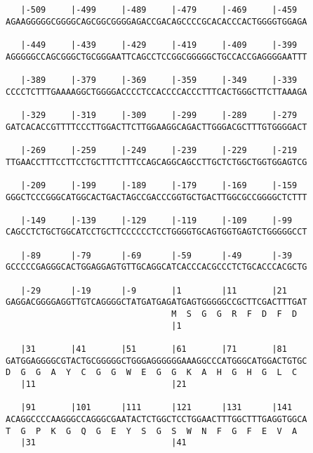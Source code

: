 \documentclass{article}
\begin{document}
\begin{Verbatim}
   |-509     |-499     |-489     |-479     |-469     |-459  
AGAAGGGGGCGGGGCAGCGGCGGGGAGACCGACAGCCCCGCACACCCACTGGGGTGGAGA
                                                            
   |-449     |-439     |-429     |-419     |-409     |-399  
AGGGGGCCAGCGGGCTGCGGGAATTCAGCCTCCGGCGGGGGCTGCCACCGAGGGGAATTT
                                                            
   |-389     |-379     |-369     |-359     |-349     |-339  
CCCCTCTTTGAAAAGGCTGGGGACCCCTCCACCCCACCCTTTCACTGGGCTTCTTAAAGA
                                                            
   |-329     |-319     |-309     |-299     |-289     |-279  
GATCACACCGTTTTCCCTTGGACTTCTTGGAAGGCAGACTTGGGACGCTTTGTGGGGACT
                                                            
   |-269     |-259     |-249     |-239     |-229     |-219  
TTGAACCTTTCCTTCCTGCTTTCTTTCCAGCAGGCAGCCTTGCTCTGGCTGGTGGAGTCG
                                                            
   |-209     |-199     |-189     |-179     |-169     |-159  
GGGCTCCCGGGCATGGCACTGACTAGCCGACCCGGTGCTGACTTGGCGCCGGGGCTCTTT
                                                            
   |-149     |-139     |-129     |-119     |-109     |-99   
CAGCCTCTGCTGGCATCCTGCTTCCCCCCTCCTGGGGTGCAGTGGTGAGTCTGGGGGCCT
                                                            
   |-89      |-79      |-69      |-59      |-49      |-39   
GCCCCCGAGGGCACTGGAGGAGTGTTGCAGGCATCACCCACGCCCTCTGCACCCACGCTG
                                                            
   |-29      |-19      |-9       |1        |11       |21    
GAGGACGGGGAGGTTGTCAGGGGCTATGATGAGATGAGTGGGGGCCGCTTCGACTTTGAT
                                 M  S  G  G  R  F  D  F  D  
                                 |1                        
  
   |31       |41       |51       |61       |71       |81    
GATGGAGGGGCGTACTGCGGGGGCTGGGAGGGGGGAAAGGCCCATGGGCATGGACTGTGC
D  G  G  A  Y  C  G  G  W  E  G  G  K  A  H  G  H  G  L  C  
   |11                           |21                        
  
   |91       |101      |111      |121      |131      |141   
ACAGGCCCCAAGGGCCAGGGCGAATACTCTGGCTCCTGGAACTTTGGCTTTGAGGTGGCA
T  G  P  K  G  Q  G  E  Y  S  G  S  W  N  F  G  F  E  V  A  
   |31                           |41                        
  

\end{Verbatim}
\end{document}
